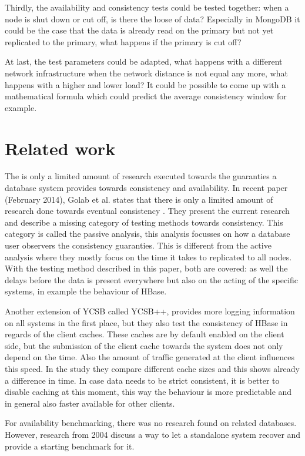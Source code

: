 \documentclass[10pt,conference,letterpaper]{IEEEtran}
\begin{document}
Thirdly, the availability and consistency tests could be tested together: when a node is shut down or cut off, is there the loose of data? Especially in MongoDB it could be the case that the data is already read on the primary but not yet replicated to the primary, what happens if the primary is cut off? 

At last, the test parameters could be adapted, what happens with a different network infrastructure when the network distance is not equal any more, what happens with a higher and lower load? It could be possible to come up with a mathematical formula which could predict the average consistency window for example.  


\section{Related work}\label{sec:related work}
The is only a limited amount of research executed towards the guaranties a database system provides towards consistency and availability. In recent paper (February 2014), Golab et al. states that there is only a limited amount of research done towards eventual consistency \cite{golab2014eventually}. They present the current research and describe a missing category of testing methods towards consistency. This category is called the passive analysis, this analysis focusses on how a database user observers the consistency guaranties. This is different from the active analysis where they mostly focus on the time it takes to replicated to all nodes.  With the testing method described in this paper, both are covered: as well the delays before the data is present everywhere but also on the acting of the specific systems, in example the behaviour of HBase. 

Another extension of YCSB called YCSB++\cite{patil2011ycsb++}, provides more logging information on all systems in the first place, but they also test the consistency of HBase in regards of the client caches. These caches are by default enabled on the client side, but the submission of the client cache towards the system does not only depend on the time. Also the amount of traffic generated at the client influences this speed. In the study they compare different cache sizes and this shows already a difference in time. In case data needs to be strict consistent, it is better to disable caching at this moment, this way the behaviour is more predictable and in general also faster available for other clients. 

For availability benchmarking, there was no research found on related databases. However, research from 2004 \cite{mauro2004system} discuss a way to let a standalone system recover and provide a starting benchmark for it.  
\end{document}
